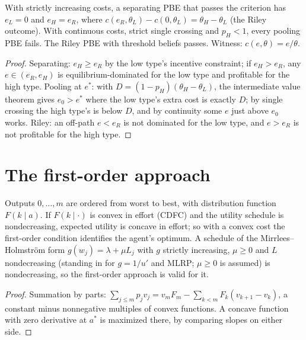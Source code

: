 \begin{theorem}
\label{thm:intuitive}
\leanok
{}
With strictly increasing costs, a separating PBE that passes the criterion has $e_L = 0$ and $e_H = e_R$, where
$c(e_R, \theta_L) - c(0, \theta_L) = \theta_H - \theta_L$ (the Riley outcome). With continuous costs, strict single crossing
and $p_H < 1$, every pooling PBE fails. The Riley PBE with threshold beliefs passes. Witness: $c(e,\theta) = e/\theta$.
\end{theorem}
\begin{proof}
\leanok
Separating: $e_H \ge e_R$ by the low type's incentive constraint; if $e_H > e_R$, any $e \in (e_R, e_H)$ is
equilibrium-dominated for the low type and profitable for the high type. Pooling at $e^*$: with
$D = (1-p_H)(\theta_H - \theta_L)$, the intermediate value theorem gives $e_0 > e^*$ where the low type's extra cost is
exactly $D$; by single crossing the high type's is below $D$, and by continuity some $e$ just above $e_0$ works. Riley:
an off-path $e < e_R$ is not dominated for the low type, and $e > e_R$ is not profitable for the high type.
\end{proof}

\section{The first-order approach}

\begin{theorem}[Rogerson 1985]
\label{thm:rogerson}
\leanok
{}
Outputs $0, \dots, m$ are ordered from worst to best, with distribution function $F(k \mid a)$. If $F(k \mid \cdot)$ is
convex in effort (CDFC) and the utility schedule is nondecreasing, expected utility is concave in effort; so with a
convex cost the first-order condition identifies the agent's optimum. A schedule of the Mirrlees--Holmström form
$g(w_j) = \lambda + \mu L_j$ with $g$ strictly increasing, $\mu \ge 0$ and $L$ nondecreasing (standing in for $g = 1/u'$
and MLRP; $\mu \ge 0$ is assumed) is nondecreasing, so the first-order approach is valid for it.
\end{theorem}
\begin{proof}
\leanok
Summation by parts: $\sum_{j\le m} p_j v_j = v_m F_m - \sum_{k<m} F_k (v_{k+1} - v_k)$, a constant minus nonnegative
multiples of convex functions. A concave function with zero derivative at $a^*$ is maximized there, by comparing
slopes on either side.
\end{proof}
